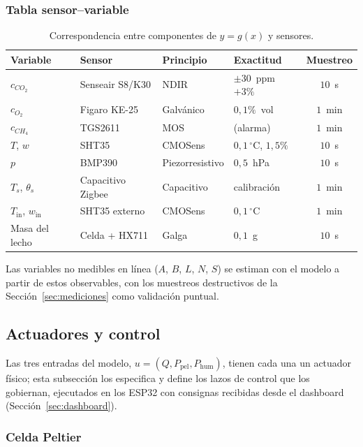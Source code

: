 \subsubsection{Tabla sensor--variable}

\begin{table}[htbp]
  \centering
  \caption{Correspondencia entre componentes de $y = g(x)$ y sensores.}
  \label{tab:sensores}
  \begin{tabular}{llllc}
    \hline
    Variable & Sensor & Principio & Exactitud & Muestreo \\
    \hline
    $c_{CO_2}$ & Senseair S8/K30 & NDIR & $\pm 30$~ppm $+3\%$ & $10$~s \\
    $c_{O_2}$ & Figaro KE-25 & Galvánico & $0{,}1\%$~vol & $1$~min \\
    $c_{CH_4}$ & TGS2611 & MOS & (alarma) & $1$~min \\
    $T$, $w$ & SHT35 & CMOSens & $0{,}1\,^\circ$C, $1{,}5\%$ & $10$~s \\
    $p$ & BMP390 & Piezorresistivo & $0{,}5$~hPa & $10$~s \\
    $T_s$, $\theta_s$ & Capacitivo Zigbee & Capacitivo & calibración & $1$~min \\
    $T_{\mathrm{in}}$, $w_{\mathrm{in}}$ & SHT35 externo & CMOSens & $0{,}1\,^\circ$C & $1$~min \\
    Masa del lecho & Celda + HX711 & Galga & $0{,}1$~g & $10$~s \\
    \hline
  \end{tabular}
\end{table}

Las variables no medibles en línea ($A$, $B$, $L$, $N$, $S$) se estiman con el
modelo a partir de estos observables, con los muestreos destructivos de la
Sección~\ref{sec:mediciones} como validación puntual.
\subsection{Actuadores y control}\label{sec:actuadores}

Las tres entradas del modelo, $u = (Q, P_{\mathrm{pel}}, P_{\mathrm{hum}})$,
tienen cada una un actuador físico; esta subsección los especifica y define
los lazos de control que los gobiernan, ejecutados en los ESP32 con consignas
recibidas desde el dashboard (Sección~\ref{sec:dashboard}).

\subsubsection{Celda Peltier}

